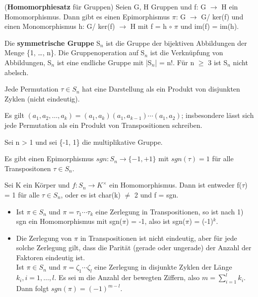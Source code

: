 \begin{theorem}
(\textbf{Homomorphiesatz} für Gruppen)
Seien G, H Gruppen und f: G $\to$ H ein Homomorphismus. Dann gibt es einen Epimorphismus $\pi$: G $\to$ G/ ker(f) und einen Monomorphismus h: G/ ker(f) $\to$ H mit f = h $\circ$ $\pi$ und im(f) = im(h).
\end{theorem}

\begin{remark}
Die \textbf{symmetrische Gruppe} S$_n$ ist die Gruppe der bijektiven Abbildungen der Menge \{1, …, n\}. Die Gruppenoperation auf S$_n$ ist die Verknüpfung von Abbildungen, S$_n$ ist eine endliche Gruppe mit |S$_n$| = n!. Für n $\ge$ 3 ist S$_n$ nicht abelsch.
\end{remark}

\begin{lemma}
\leavevmode
\begin{compactenum}
\item Jede Permutation $\tau \in S_n$ hat eine Darstellung als ein Produkt von disjunkten Zyklen (nicht eindeutig).
\item Es gilt $(a_1, a_2, …, a_k) = (a_1, a_k)(a_1, a_{k-1}) \cdots (a_1, a_2)$; insbesondere lässt sich jede Permutation als ein Produkt von Transpositionen schreiben.
\end{compactenum}
\end{lemma}

\begin{theorem}
Sei n > 1 und sei \{-1, 1\} die multiplikative Gruppe.
\begin{compactenum}
\item Es gibt einen Epimorphismus $sgn: S_n \to \{-1,+1\}$ mit $sgn(\tau) = 1$ für alle Transpositonen $\tau \in S_n$.
\item Sei K ein Körper und $f: S_n \to K^\times$ ein Homomorphismus. Dann ist entweder f($\tau$) = 1 für alle $\tau \in S_n$, oder es ist char(k) $\neq$ 2 und f = sgn.
\end{compactenum}
\end{theorem}

\begin{remark}
\leavevmode
\begin{itemize}
\item Ist $\pi \in S_n$ und $\pi = \tau_1 \cdots \tau_k$ eine Zerlegung in Transpositionen, so ist nach 1) sgn ein Homomorphismus mit sgn($\pi$) = -1, also ist sgn($\pi$) = (-1)$^k$.

\item Die Zerlegung von $\pi$ in Transpositionen ist nicht eindeutig, aber für jede solche Zerlegung gilt, dass die Parität (gerade oder ungerade) der Anzahl der Faktoren eindeutig ist.\\
Ist $\pi \in S_n$ und $\pi = \zeta_1 \cdots \zeta_l$ eine Zerlegung in disjunkte Zyklen der Länge $k_i, i = 1, …, l$. Es sei m die Anzahl der bewegten Ziffern, also $m = \sum\nolimits_{i=1}^{l} k_i$. Dann folgt $sgn(\pi) = (-1)^{m-l}$.
\end{itemize}
\end{remark}

